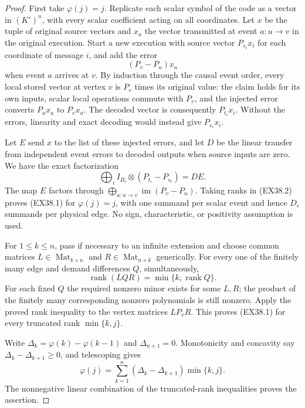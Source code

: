 \begin{proof}
First take $\varphi(j)=j$. Replicate each scalar symbol of the code
as a vector in $(K')^n$, with every scalar coefficient acting on all
coordinates. Let $x$ be the tuple of original source vectors and
$x_a$ the vector transmitted at event $a:u\to v$ in the original
execution. Start a new execution with source vector $P_{s_i}x_i$
for each coordinate of message $i$, and add the error
\[
 (P_v-P_u)x_a
\]
when event $a$ arrives at $v$. By induction through the causal event
order, every local stored vector at vertex $v$ is $P_v$ times its
original value: the claim holds for its own inputs, scalar local
operations commute with $P_v$, and the injected error converts
$P_ux_a$ to $P_vx_a$. The decoded vector is consequently $P_{t_i}x_i$.
Without the errors, linearity and exact decoding would instead give
$P_{s_i}x_i$.

Let $E$ send $x$ to the list of these injected errors, and let $D$ be
the linear transfer from independent event errors to decoded outputs
when source inputs are zero. We have the exact factorization
\[
 \bigoplus_i I_{B_i}\otimes(P_{t_i}-P_{s_i})=DE.
 \tag{EX38.2}
\]
The map $E$ factors through
$\bigoplus_{a:u\to v}\operatorname{im}(P_v-P_u)$.
Taking ranks in (EX38.2) proves (EX38.1) for $\varphi(j)=j$,
with one summand per scalar event and hence $D_e$ summands per
physical edge. No sign, characteristic, or positivity assumption
is used.

For $1\le k\le n$, pass if necessary to an infinite extension and
choose common matrices $L\in\operatorname{Mat}_{k\times n}$ and
$R\in\operatorname{Mat}_{n\times k}$ generically. For every one of
the finitely many edge and demand differences $Q$, simultaneously,
\[
 \operatorname{rank}(LQR)=\min\{k,\operatorname{rank}Q\}.
\]
For each fixed $Q$ the required nonzero minor exists for some $L,R$;
the product of the finitely many corresponding nonzero polynomials
is still nonzero. Apply the proved rank inequality to the vertex
matrices $LP_vR$. This proves (EX38.1) for every truncated rank
$\min\{k,j\}$.

Write $\Delta_k=\varphi(k)-\varphi(k-1)$ and
$\Delta_{n+1}=0$. Monotonicity and concavity say
$\Delta_k-\Delta_{k+1}\ge0$, and telescoping gives
\[
 \varphi(j)=\sum_{k=1}^n
       (\Delta_k-\Delta_{k+1})\min\{k,j\}.
\]
The nonnegative linear combination of the truncated-rank
inequalities proves the assertion.
\end{proof}

